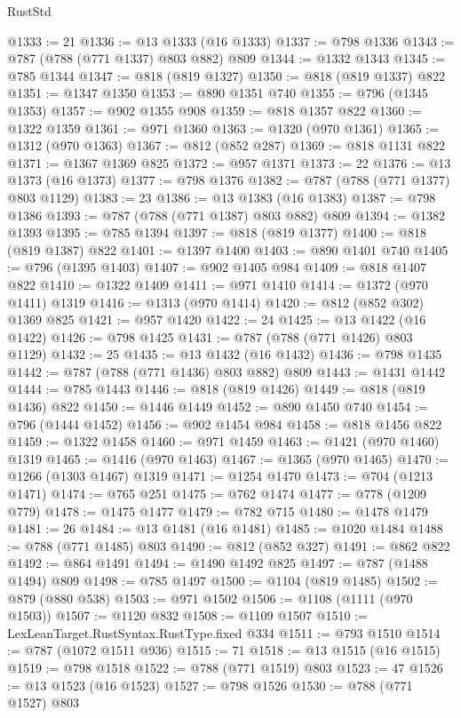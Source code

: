 \begin{lexlean}{RustStd}
\begin{coremodule}
@1333 := 21
@1336 := @13 @1333 (@16 @1333)
@1337 := @798 @1336
@1343 := @787 (@788 (@771 @1337) @803 @882) @809
@1344 := @1332 @1343
@1345 := @785 @1344
@1347 := @818 (@819 @1327)
@1350 := @818 (@819 @1337) @822
@1351 := @1347 @1350
@1353 := @890 @1351 @740
@1355 := @796 (@1345 @1353)
@1357 := @902 @1355 @908
@1359 := @818 @1357 @822
@1360 := @1322 @1359
@1361 := @971 @1360
@1363 := @1320 (@970 @1361)
@1365 := @1312 (@970 @1363)
@1367 := @812 (@852 @287)
@1369 := @818 @1131 @822
@1371 := @1367 @1369 @825
@1372 := @957 @1371
@1373 := 22
@1376 := @13 @1373 (@16 @1373)
@1377 := @798 @1376
@1382 := @787 (@788 (@771 @1377) @803 @1129)
@1383 := 23
@1386 := @13 @1383 (@16 @1383)
@1387 := @798 @1386
@1393 := @787 (@788 (@771 @1387) @803 @882) @809
@1394 := @1382 @1393
@1395 := @785 @1394
@1397 := @818 (@819 @1377)
@1400 := @818 (@819 @1387) @822
@1401 := @1397 @1400
@1403 := @890 @1401 @740
@1405 := @796 (@1395 @1403)
@1407 := @902 @1405 @984
@1409 := @818 @1407 @822
@1410 := @1322 @1409
@1411 := @971 @1410
@1414 := @1372 (@970 @1411) @1319
@1416 := @1313 (@970 @1414)
@1420 := @812 (@852 @302) @1369 @825
@1421 := @957 @1420
@1422 := 24
@1425 := @13 @1422 (@16 @1422)
@1426 := @798 @1425
@1431 := @787 (@788 (@771 @1426) @803 @1129)
@1432 := 25
@1435 := @13 @1432 (@16 @1432)
@1436 := @798 @1435
@1442 := @787 (@788 (@771 @1436) @803 @882) @809
@1443 := @1431 @1442
@1444 := @785 @1443
@1446 := @818 (@819 @1426)
@1449 := @818 (@819 @1436) @822
@1450 := @1446 @1449
@1452 := @890 @1450 @740
@1454 := @796 (@1444 @1452)
@1456 := @902 @1454 @984
@1458 := @818 @1456 @822
@1459 := @1322 @1458
@1460 := @971 @1459
@1463 := @1421 (@970 @1460) @1319
@1465 := @1416 (@970 @1463)
@1467 := @1365 (@970 @1465)
@1470 := @1266 (@1303 @1467) @1319
@1471 := @1254 @1470
@1473 := @704 (@1213 @1471)
@1474 := @765 @251
@1475 := @762 @1474
@1477 := @778 (@1209 @779)
@1478 := @1475 @1477
@1479 := @782 @715
@1480 := @1478 @1479
@1481 := 26
@1484 := @13 @1481 (@16 @1481)
@1485 := @1020 @1484
@1488 := @788 (@771 @1485) @803
@1490 := @812 (@852 @327)
@1491 := @862 @822
@1492 := @864 @1491
@1494 := @1490 @1492 @825
@1497 := @787 (@1488 @1494) @809
@1498 := @785 @1497
@1500 := @1104 (@819 @1485)
@1502 := @879 (@880 @538)
@1503 := @971 @1502
@1506 := @1108 (@1111 (@970 @1503))
@1507 := @1120 @832
@1508 := @1109 @1507
@1510 := LexLeanTarget.RustSyntax.RustType.fixed @334
@1511 := @793 @1510
@1514 := @787 (@1072 @1511 @936)
@1515 := 71
@1518 := @13 @1515 (@16 @1515)
@1519 := @798 @1518
@1522 := @788 (@771 @1519) @803
@1523 := 47
@1526 := @13 @1523 (@16 @1523)
@1527 := @798 @1526
@1530 := @788 (@771 @1527) @803

\end{coremodule}
\end{lexlean}
